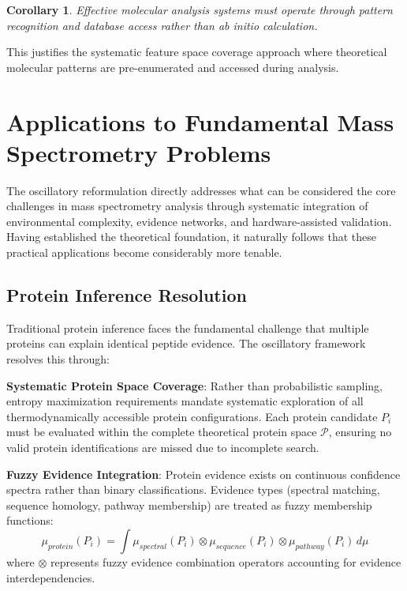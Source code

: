 \documentclass[11pt,a4paper]{article}
\newtheorem{corollary}{Corollary}
\begin{document}
\begin{corollary}
Effective molecular analysis systems must operate through pattern recognition and database access rather than ab initio calculation.
\end{corollary}

This justifies the systematic feature space coverage approach where theoretical molecular patterns are pre-enumerated and accessed during analysis.

\section{Applications to Fundamental Mass Spectrometry Problems}

The oscillatory reformulation directly addresses what can be considered the core challenges in mass spectrometry analysis through systematic integration of environmental complexity, evidence networks, and hardware-assisted validation. Having established the theoretical foundation, it naturally follows that these practical applications become considerably more tenable.

\subsection{Protein Inference Resolution}

Traditional protein inference faces the fundamental challenge that multiple proteins can explain identical peptide evidence. The oscillatory framework resolves this through:

\textbf{Systematic Protein Space Coverage}: Rather than probabilistic sampling, entropy maximization requirements mandate systematic exploration of all thermodynamically accessible protein configurations. Each protein candidate $P_i$ must be evaluated within the complete theoretical protein space $\mathcal{P}$, ensuring no valid protein identifications are missed due to incomplete search.

\textbf{Fuzzy Evidence Integration}: Protein evidence exists on continuous confidence spectra rather than binary classifications. Evidence types (spectral matching, sequence homology, pathway membership) are treated as fuzzy membership functions:
\begin{equation}
\mu_{protein}(P_i) = \int \mu_{spectral}(P_i) \otimes \mu_{sequence}(P_i) \otimes \mu_{pathway}(P_i) \, d\mu
\end{equation}
where $\otimes$ represents fuzzy evidence combination operators accounting for evidence interdependencies.
\end{document}
